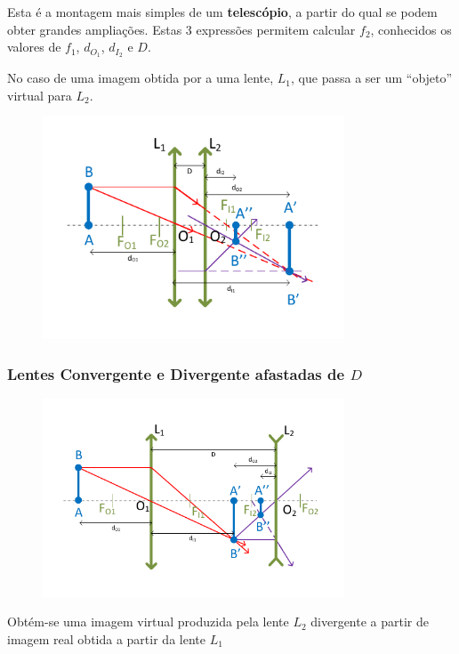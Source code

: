 \documentclass[a4paper,12pt]{article}      %
\begin{document}
Esta é a montagem mais simples de um \textbf{telescópio}, a partir do qual se podem obter grandes ampliações.
Estas 3 expressões permitem calcular $f_2$, conhecidos os valores de $f_1$, $d_{O_1}$, $d_{I_2}$ e $D$.

No caso de uma imagem obtida por a uma lente, $L_1$, que passa a ser um “objeto” virtual para $L_2$.
\begin{figure}	[!htb]  \centering 
	\includegraphics[width=0.8\textwidth]{duplaConver_II}
\end{figure}

\newpage
\subsubsection{\sf Lentes Convergente e Divergente afastadas de $D$}

\begin{figure}	[!htb]  \centering 
	\includegraphics[width=0.8\textwidth]{ConverDiverg_I}
\end{figure}

Obtém-se uma imagem virtual produzida pela lente $L_2$ divergente a partir de imagem real obtida a partir da lente $L_1$
\end{document}

